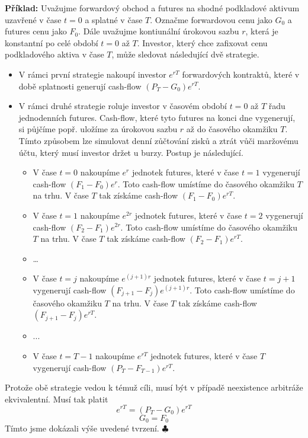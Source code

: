 \documentclass[a4paper]{book}
\begin{document}
\noindent \textbf{Příklad:} Uvažujme forwardový obchod a futures na shodné podkladové aktivum uzavřené v čase $t = 0$ a splatné v čase $T$. Označme forwardovou cenu jako $G_0$ a futures cenu jako $F_0$. Dále uvažujme kontiunální úrokovou sazbu $r$, která je konstantní po celé období $t = 0$ až $T$. Investor, který chce zafixovat cenu podkladového aktiva v čase $T$, může sledovat následující dvě strategie.
\begin{itemize}
\item V rámci první strategie nakoupí investor $e^{rT}$ forwardových kontraktů, které v době splatnosti generují cash-flow $(P_T - G_0)e^{rT}$.
\item V rámci druhé strategie roluje investor v časovém období $t=0$ až $T$ řadu jednodenních futures. Cash-flow, které tyto futures na konci dne vygenerují, si půjčíme popř. uložíme za úrokovou sazbu $r$ až do časového okamžiku $T$. Tímto způsobem lze simulovat denní zůčtování zisků a ztrát vůči maržovému účtu, který musí investor držet u burzy. Postup je následující.
\begin{itemize}
\item V čase $t=0$ nakoupíme $e^r$ jednotek futures, které v čase $t=1$ vygenerují cash-flow $(F_1 - F_0)e^r$. Toto cash-flow umístíme do časového okamžiku $T$ na trhu. V čase $T$ tak získáme cash-flow $(F_1 - F_0)e^{rT}$.
\item V čase $t=1$ nakoupíme $e^{2r}$ jednotek futures, které v čase $t=2$ vygenerují cash-flow $(F_2 - F_1)e^{2r}$. Toto cash-flow umístíme do časového okamžiku $T$ na trhu. V čase $T$ tak získáme cash-flow $(F_2 - F_1)e^{rT}$.
\item \dots
\item V čase $t=j$ nakoupíme $e^{(j+1)r}$ jednotek futures, které v čase $t=j+1$ vygenerují cash-flow $(F_{j+1} - F_j)e^{(j+1)r}$. Toto cash-flow umístíme do časového okamžiku $T$ na trhu. V čase $T$ tak získáme cash-flow $(F_{j+1} - F_j)e^{rT}$.
\item ...
\item V čase $t=T-1$ nakoupíme $e^{rT}$ jednotek futures, které v čase $T$ vygenerují cash-flow $(P_T - F_{T-1})e^{rT}$.
\end{itemize}
\end{itemize}
Protože obě strategie vedou k témuž cíli, musí být v případě neexistence arbitráže ekvivalentní. Musí tak platit
\begin{equation*}
[(F_1 - F_0) + (F_2 - F_1) + \dots + (P_T - F_{T-1})]e^{rT} = (P_T - G_0)e^{rT}
\end{equation*}
\begin{equation*}
G_0 = F_0
\end{equation*}
Tímto jsme dokázali výše uvedené tvrzení. $\clubsuit$
\end{document}
